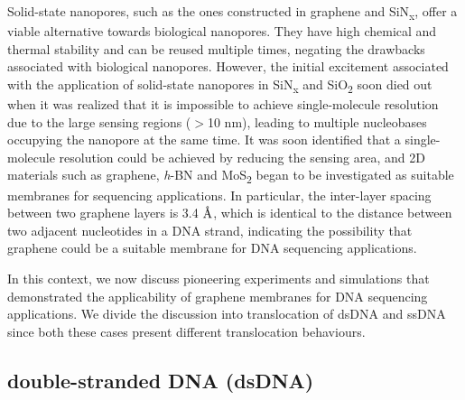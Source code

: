 Solid-state nanopores, such as the ones constructed in graphene and SiN\textsubscript{x}, offer a viable alternative towards biological nanopores. They have high chemical and thermal stability and can be reused multiple times, negating the drawbacks associated with biological nanopores. However, the initial excitement associated with the application of solid-state nanopores in SiN\textsubscript{x} and SiO\textsubscript{2} soon died out when it was realized that it is impossible to achieve single-molecule resolution due to the large sensing regions ($>$10 nm), leading to multiple nucleobases occupying the nanopore at the same time\supercite{li_dna_2003,storm_translocation_2005}. It was soon identified that a single-molecule resolution could be achieved by reducing the sensing area, and 2D materials such as graphene\supercite{garaj_graphene_2010,schneider_dna_2010,wells_assessing_2012,merchant_dna_2010}, \textit{h}-BN and MoS\textsubscript{2}\supercite{liu_spontaneous_2020,qiu_detection_2017,zou_spontaneous_2020,luan_spontaneous_2018} began to be investigated as suitable membranes for sequencing applications. In particular, the inter-layer spacing between two graphene layers is 3.4 $\text{\normalfont\AA}$, which is identical to the distance between two adjacent nucleotides in a DNA strand, indicating the possibility that graphene could be a suitable membrane for DNA sequencing applications.

In this context, we now discuss pioneering experiments and simulations that demonstrated the applicability of graphene membranes for DNA sequencing applications. We divide the discussion into translocation of dsDNA and ssDNA since both these cases present different translocation behaviours.

\subsection{double-stranded DNA (dsDNA)}
